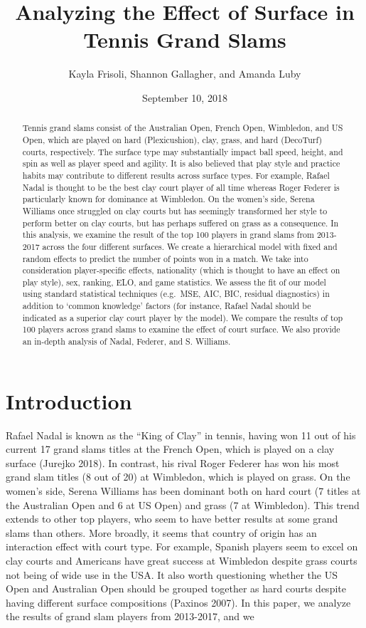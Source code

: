 \documentclass[]{article}
\title{Analyzing the Effect of Surface in Tennis Grand Slams}
\author{Kayla Frisoli, Shannon Gallagher, and Amanda Luby}
\date{September 10, 2018}
\begin{document}
\maketitle
\begin{abstract}
Tennis grand slams consist of the Australian Open, French Open,
Wimbledon, and US Open, which are played on hard (Plexicushion), clay,
grass, and hard (DecoTurf) courts, respectively. The surface type may
substantially impact ball speed, height, and spin as well as player
speed and agility. It is also believed that play style and practice
habits may contribute to different results across surface types. For
example, Rafael Nadal is thought to be the best clay court player of all
time whereas Roger Federer is particularly known for dominance at
Wimbledon. On the women's side, Serena Williams once struggled on clay
courts but has seemingly transformed her style to perform better on clay
courts, but has perhaps suffered on grass as a consequence. In this
analysis, we examine the result of the top 100 players in grand slams
from 2013-2017 across the four different surfaces. We create a
hierarchical model with fixed and random effects to predict the number
of points won in a match. We take into consideration player-specific
effects, nationality (which is thought to have an effect on play style),
sex, ranking, ELO, and game statistics. We assess the fit of our model
using standard statistical techniques (e.g.~MSE, AIC, BIC, residual
diagnostics) in addition to `common knowledge' factors (for instance,
Rafael Nadal should be indicated as a superior clay court player by the
model). We compare the results of top 100 players across grand slams to
examine the effect of court surface. We also provide an in-depth
analysis of Nadal, Federer, and S. Williams.
\end{abstract}

\hypertarget{sec:iintro}{%
\section{Introduction}\label{sec:iintro}}

Rafael Nadal is known as the ``King of Clay'' in tennis, having won 11
out of his current 17 grand slams titles at the French Open, which is
played on a clay surface (Jurejko 2018). In contrast, his rival Roger
Federer has won his most grand slam titles (8 out of 20) at Wimbledon,
which is played on grass. On the women's side, Serena Williams has been
dominant both on hard court (7 titles at the Australian Open and 6 at US
Open) and grass (7 at Wimbledon). This trend extends to other top
players, who seem to have better results at some grand slams than
others. More broadly, it seems that country of origin has an interaction
effect with court type. For example, Spanish players seem to excel on
clay courts and Americans have great success at Wimbledon despite grass
courts not being of wide use in the USA. It also worth questioning
whether the US Open and Australian Open should be grouped together as
hard courts despite having different surface compositions (Paxinos
2007). In this paper, we analyze the results of grand slam players from
2013-2017, and we
\end{document}
